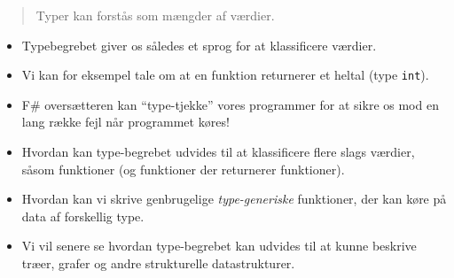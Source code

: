 \documentclass[rgb]{beamer}
\begin{document}
\popmaketitleframe


\begin{frame}[fragile]
\begin{footnotesize}


  \begin{quote}
    Typer kan forstås som mængder af værdier.
  \end{quote}

  \begin{itemize}
    \item Typebegrebet giver os således et sprog for at klassificere værdier.

    \item Vi kan for eksempel tale om at en funktion returnerer et heltal (type \lstinline{int}).

    \item F\# oversætteren kan ``type-tjekke'' vores programmer for at
  sikre os mod en lang række fejl når programmet køres!
  \end{itemize}

  \begin{itemize}
    \item Hvordan kan type-begrebet udvides til at klassificere flere
      slags værdier, såsom funktioner (og funktioner der returnerer
      funktioner).
    \item Hvordan kan vi skrive genbrugelige \emph{type-generiske}
      funktioner, der kan køre på data af forskellig type.
    \item Vi vil senere se hvordan type-begrebet kan udvides til at
      kunne beskrive træer, grafer og andre strukturelle
      datastrukturer.
  \end{itemize}
\end{footnotesize}
\end{frame}

\newcommand{\Z}{\mathbb{Z}}
\newcommand{\N}{\mathbb{N}}
\newcommand{\R}{\mathbb{R}}
\end{document}

